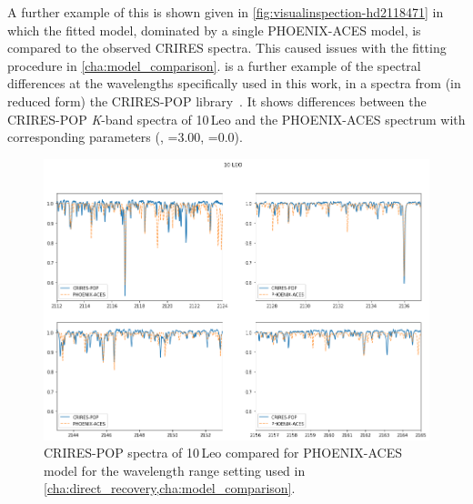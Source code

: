 A further example of this is shown given in \cref{fig:visualinspection-hd2118471} in which the fitted model, dominated by a single {PHOENIX-ACES} model, is compared to the observed {CRIRES} spectra.
This caused issues with the fitting procedure in \cref{cha:model_comparison}.
 is a further example of the spectral differences at the \nir{} wavelengths specifically used in this work, in a spectra from (in reduced form) the CRIRES-POP library~\citep{lebzelter_crirespop_2012,nicholls_crirespop_2017}.
It shows differences between the CRIRES-POP \emph{K}-band spectra of {10\,Leo} and the {PHOENIX-ACES} spectrum with corresponding parameters (, \logg{}=3.00, \feh{}=0.0).


\begin{figure}
    \centering
    \includegraphics[width=0.7\linewidth]{figures/atmos_and_models/CRIRES-POP-mismatch}
    \caption[Comparision of the spectrum of {10\,Leo} to synthetic {PHOENIX-ACES} spectum.]{CRIRES-POP spectra of {10\,Leo} compared for {PHOENIX-ACES} model for the wavelength range setting used in \cref{cha:direct_recovery,cha:model_comparison}.}
    \label{fig:crires-pop-mismatch}
\end{figure}
